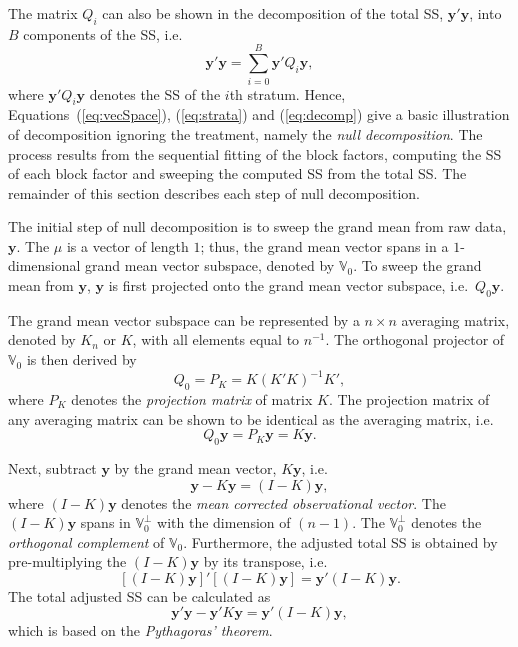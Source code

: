 \documentclass[article]{jss}
\begin{document}
The matrix $Q_i$ can also be shown in the decomposition of the total SS, $\bm{y}'\bm{y}$, into $B$ components of the SS, i.e.\ 
\begin{equation}
\label{eq:decomp}
\bm{y}'\bm{y} = \sum_{i=0}^{B}\bm{y}'Q_i\bm{y},
\end{equation}
where $\bm{y}'Q_i\bm{y}$ denotes the SS of the $i$th stratum. Hence, Equations~(\ref{eq:vecSpace}), (\ref{eq:strata}) and (\ref{eq:decomp}) give a basic illustration of decomposition ignoring the treatment, namely the \emph{null decomposition}. The process results from the sequential fitting of the block factors, computing the SS of each block factor and sweeping the computed SS from the total SS. The remainder of this section describes each step of null decomposition.

The initial step of null decomposition is to sweep the grand mean from raw data, $\bm{y}$. The $\mu$ is a vector of length $1$; thus, the grand mean vector spans in a $1$-dimensional grand mean vector subspace, denoted by $\mathbb{V}_0$. To sweep the grand mean from $\bm{y}$, $\bm{y}$ is first projected onto the grand mean vector subspace, i.e.\ $Q_{0}\bm{y}$.

The grand mean vector subspace can be represented by a $n \times n$ averaging matrix, denoted by $K_n$ or $K$, with all elements equal to ${n}^{-1}$. The orthogonal projector of $\mathbb{V}_0$ is then derived by
\begin{equation}
\label{eq:vectorProj}
Q_{0} = P_{K} = K(K'K)^{-1}K',
\end{equation}
where $P_K$ denotes the \emph{projection matrix} of matrix $K$. The projection matrix of any averaging matrix can be shown to be identical as the averaging matrix, i.e.\ 
\[Q_{0} \bm{y} = P_{K} \bm{y} = K \bm{y}.\] 


Next, subtract $\bm{y}$ by the grand mean vector, $K\bm{y}$, i.e.\
\[\bm{y} -  K\bm{y} = (I-K)\bm{y},\]
where $(I-K)\bm{y}$ denotes the \emph{mean corrected observational vector}. The $(I-K)\bm{y}$ spans in $\mathbb{V}^{\perp}_0$ with the dimension of $(n - 1)$. The $\mathbb{V}^{\perp}_0$ denotes the \emph{orthogonal complement} of $\mathbb{V}_0$. Furthermore, the adjusted total SS is obtained by pre-multiplying the $(I-K)\bm{y}$ by its transpose, i.e.\
\begin{equation}
\label{eq:adjustSS}
[(I - K)\bm{y}]'[(I - K)\bm{y}] = \bm{y}'(I-K)\bm{y}.
\end{equation}
The total adjusted SS can be calculated as
\[
\bm{y}'\bm{y} - \bm{y}'K\bm{y} = \bm{y}'(I-K)\bm{y},
\]
which is based on the \emph{Pythagoras' theorem}.
\end{document}

